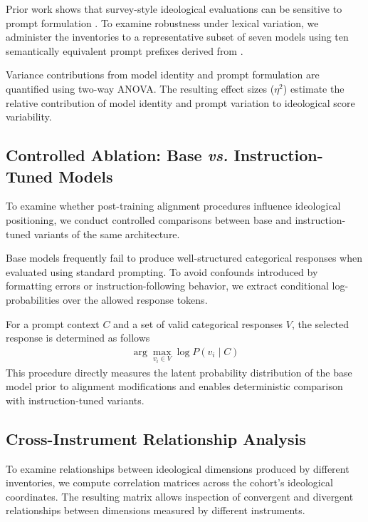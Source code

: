 \documentclass[11pt]{article}
\begin{document}
Prior work shows that survey-style ideological evaluations can be sensitive to prompt formulation \cite{rottger-etal-2024-political}. To examine robustness under lexical variation, we administer the inventories to a representative subset of seven models using ten semantically equivalent prompt prefixes derived from \citet{rottger-etal-2024-political}.

Variance contributions from model identity and prompt formulation are quantified using two-way ANOVA. The resulting effect sizes ($\eta^2$) estimate the relative contribution of model identity and prompt variation to ideological score variability.

\subsection{Controlled Ablation: Base \textit{vs.} Instruction-Tuned Models}

To examine whether post-training alignment procedures influence ideological positioning, we conduct controlled comparisons between base and instruction-tuned variants of the same architecture.

Base models frequently fail to produce well-structured categorical responses when evaluated using standard prompting. To avoid confounds introduced by formatting errors or instruction-following behavior, we extract conditional log-probabilities over the allowed response tokens.

For a prompt context $C$ and a set of valid categorical responses $V$, the selected response is determined as follows
\vspace{-2mm}
\begin{align}
\arg\max_{v_i \in V} \log P(v_i \mid C)
\end{align}
This procedure directly measures the latent probability distribution of the base model prior to alignment modifications and enables deterministic comparison with instruction-tuned variants.

\subsection{Cross-Instrument Relationship Analysis}

To examine relationships between ideological dimensions produced by different inventories, we compute correlation matrices across the cohort's ideological coordinates. The resulting matrix allows inspection of convergent and divergent relationships between dimensions measured by different instruments.
\end{document}

